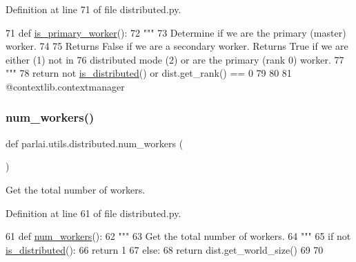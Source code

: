 Definition at line 71 of file distributed.\+py.


\begin{DoxyCode}
71 \textcolor{keyword}{def }\hyperlink{namespaceparlai_1_1utils_1_1distributed_a9bb1dac198180590ef8c6b6c6f9fc2c4}{is\_primary\_worker}():
72     \textcolor{stringliteral}{"""}
73 \textcolor{stringliteral}{    Determine if we are the primary (master) worker.}
74 \textcolor{stringliteral}{}
75 \textcolor{stringliteral}{    Returns False if we are a secondary worker. Returns True if we are either (1) not in}
76 \textcolor{stringliteral}{    distributed mode (2) or are the primary (rank 0) worker.}
77 \textcolor{stringliteral}{    """}
78     \textcolor{keywordflow}{return} \textcolor{keywordflow}{not} \hyperlink{namespaceparlai_1_1utils_1_1distributed_a023acb5e3b66e1f27e21247c35661279}{is\_distributed}() \textcolor{keywordflow}{or} dist.get\_rank() == 0
79 
80 
81 @contextlib.contextmanager
\end{DoxyCode}
\mbox{\label{namespaceparlai_1_1utils_1_1distributed_a99b61b4756577c6542039c238d670dba}} 
\subsubsection{\texorpdfstring{num\+\_\+workers()}{num\_workers()}}
{\footnotesize\ttfamily def parlai.\+utils.\+distributed.\+num\+\_\+workers (\begin{DoxyParamCaption}{ }\end{DoxyParamCaption})}

\begin{DoxyVerb}Get the total number of workers.
\end{DoxyVerb}
 

Definition at line 61 of file distributed.\+py.


\begin{DoxyCode}
61 \textcolor{keyword}{def }\hyperlink{namespaceparlai_1_1utils_1_1distributed_a99b61b4756577c6542039c238d670dba}{num\_workers}():
62     \textcolor{stringliteral}{"""}
63 \textcolor{stringliteral}{    Get the total number of workers.}
64 \textcolor{stringliteral}{    """}
65     \textcolor{keywordflow}{if} \textcolor{keywordflow}{not} \hyperlink{namespaceparlai_1_1utils_1_1distributed_a023acb5e3b66e1f27e21247c35661279}{is\_distributed}():
66         \textcolor{keywordflow}{return} 1
67     \textcolor{keywordflow}{else}:
68         \textcolor{keywordflow}{return} dist.get\_world\_size()
69 
70 
\end{DoxyCode}
\mbox{\label{namespaceparlai_1_1utils_1_1distributed_a601345e55fc3fc3845c43efa1a04db56}} 
